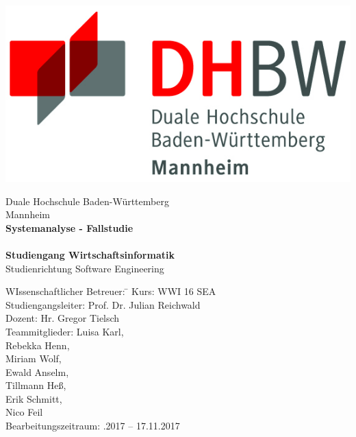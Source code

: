\begin{titlepage}
\begin{minipage}{\textwidth}
		\vspace{-2cm}
		\noindent  
		\centering \includegraphics{img/logo.jpg}
\end{minipage}
\vspace{1em}
\sffamily
\begin{center}
	\textsf{\large{}Duale Hochschule Baden-W\"urttemberg\\[1.5mm] Mannheim}\\[2em]
	\textsf{\textbf{\Large{}Systemanalyse - Fallstudie}}\\[3mm]
	\textsf{\textbf{\DerTitelDerArbeit}} \\[1.5cm]
	\textsf{\textbf{\Large{}Studiengang Wirtschaftsinformatik}\\[3mm] \textsf{Studienrichtung Software Engineering}}
	
	\vspace{5em}

\begin{minipage}{\textwidth}

\begin{tabbing}
	WIssenschaftlicher Betreuer:
	\hspace{0.5cm}\=\kill
	Kurs: \> WWI 16 SEA \\[1.5mm]
	Studiengangsleiter: \> Prof. Dr. Julian Reichwald  \\[1.5mm]
	Dozent: \> Hr. Gregor Tielsch  \\[1.5mm]
	Teammitglieder: \> Luisa Karl, \\ \> Rebekka Henn, \\ \> Miriam Wolf, \\ \> Ewald Anselm, \\ \> Tillmann Heß, \\ \> Erik Schmitt, \\ \> Nico Feil \\[1.5mm]
	Bearbeitungszeitraum: .2017 -- 17.11.2017
\end{tabbing}
\end{minipage}

\end{center}

\end{titlepage}